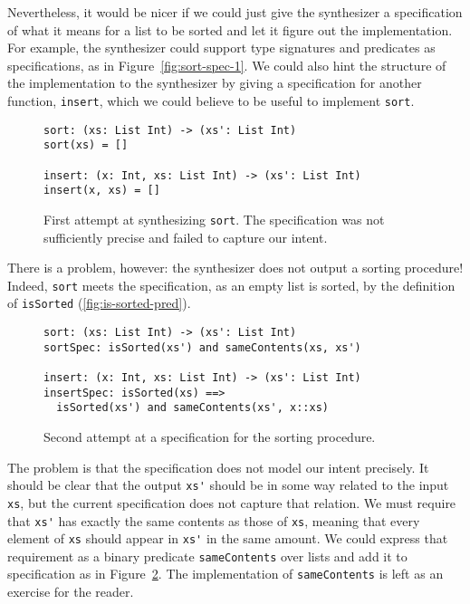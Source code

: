 Nevertheless, it would be nicer if we could just give the synthesizer a
specification of what it means for a list to be sorted and let it figure out the
implementation. For example, the synthesizer could support type signatures and
predicates as specifications, as in Figure~\ref{fig:sort-spec-1}. We could also
hint the structure of the implementation to the synthesizer by giving a
specification for another function, \verb|insert|, which we could believe to be
useful to implement \verb|sort|.

\begin{figure}[h!]
  \centering
\begin{verbatim}
sort: (xs: List Int) -> (xs': List Int)
sort(xs) = []

insert: (x: Int, xs: List Int) -> (xs': List Int)
insert(x, xs) = []
\end{verbatim}
  \cprotect\caption{First attempt at synthesizing \verb|sort|. The specification
    was not sufficiently precise and failed to capture our intent.}
  \label{fig:sort-synth-1}
\end{figure}

There is a problem, however: the synthesizer does not output a sorting
procedure! Indeed, \verb|sort| meets the specification, as an empty list is
sorted, by the definition of \verb|isSorted| (\ref{fig:is-sorted-pred}).

\begin{figure}[h!]
  \centering
\begin{verbatim}
sort: (xs: List Int) -> (xs': List Int)
sortSpec: isSorted(xs') and sameContents(xs, xs')

insert: (x: Int, xs: List Int) -> (xs': List Int)
insertSpec: isSorted(xs) ==>
  isSorted(xs') and sameContents(xs', x::xs)
\end{verbatim}
  \caption{Second attempt at a specification for the sorting procedure.}
  \label{fig:sort-spec-2}
\end{figure}

The problem is that the specification does not model our intent precisely. It
should be clear that the output \verb|xs'| should be in some way related to the
input \verb|xs|, but the current specification does not capture that relation.
We must require that \verb|xs'| has exactly the same contents as those of
\verb|xs|, meaning that every element of \verb|xs| should appear in \verb|xs'|
in the same amount. We could express that requirement as a binary predicate
\verb|sameContents| over lists and add it to specification as in
Figure~\ref{fig:sort-spec-2}. The implementation of \verb|sameContents| is left
as an exercise for the reader.

